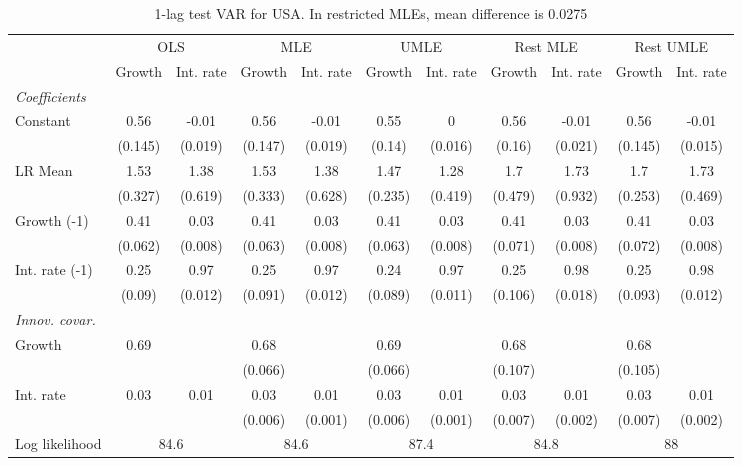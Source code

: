\begin{table}[htbp] 
	\centering
	\begin{tabular}{@{\extracolsep{4pt}}lcccccccccc@{}}		\hline\hline
		 		 & \multicolumn{2}{c}{OLS} &\multicolumn{2}{c}{MLE} &\multicolumn{2}{c}{UMLE} &\multicolumn{2}{c}{Rest MLE} &\multicolumn{2}{c}{Rest UMLE} \\ 
 		 & Growth 	 & Int. rate 	 & Growth 	 & Int. rate 	 & Growth 	 & Int. rate 	 & Growth 	 & Int. rate 	 & Growth 	 & Int. rate\\\cline{2-3}\cline{4-5}\cline{6-7}\cline{8-9}\cline{10-11}
\rule{0pt}{4ex} 
 \emph{Coefficients} 	  		 & 		 & 		 & 		 & 		 & 		 & 		 & 		 & 		 & 		 &\\ 
\quad Constant 	 & 0.56 	 & -0.01 	 & 0.56 	 & -0.01 	 & 0.55 	 & 0 	 & 0.56 	 & -0.01 	 & 0.56 	 & -0.01	 \\ 
 		 & (0.145) 	 & (0.019) 	 & (0.147) 	 & (0.019) 	 & (0.14) 	 & (0.016) 	 & (0.16) 	 & (0.021) 	 & (0.145) 	 & (0.015) 	 \\ 
\quad LR Mean 	 & 1.53 	 & 1.38 	 & 1.53 	 & 1.38 	 & 1.47 	 & 1.28 	 & 1.7 	 & 1.73 	 & 1.7 	 & 1.73	 \\ 
 		 & (0.327) 	 & (0.619) 	 & (0.333) 	 & (0.628) 	 & (0.235) 	 & (0.419) 	 & (0.479) 	 & (0.932) 	 & (0.253) 	 & (0.469) 	 \\ 
\quad Growth (-1) 	 &0.41 	 & 0.03 	 & 0.41 	 & 0.03 	 & 0.41 	 & 0.03 	 & 0.41 	 & 0.03 	 & 0.41 	 & 0.03	 \\ 
 		 & (0.062) 	 & (0.008) 	 & (0.063) 	 & (0.008) 	 & (0.063) 	 & (0.008) 	 & (0.071) 	 & (0.008) 	 & (0.072) 	 & (0.008) 	 \\ 
\quad Int. rate (-1) 	 &0.25 	 & 0.97 	 & 0.25 	 & 0.97 	 & 0.24 	 & 0.97 	 & 0.25 	 & 0.98 	 & 0.25 	 & 0.98	 \\ 
 		 & (0.09) 	 & (0.012) 	 & (0.091) 	 & (0.012) 	 & (0.089) 	 & (0.011) 	 & (0.106) 	 & (0.018) 	 & (0.093) 	 & (0.012) 	 \\ 
\rule{0pt}{4ex} \emph{Innov. covar.}  	 & 	 & 	 & 	 & 	 & 	 & 	 & 	 & 	 & 	 &\\ 
\quad Growth 	 &0.69 	 &  	 & 0.68 	 &  	 & 0.69 	 &  	 & 0.68 	 &  	 & 0.68 	 & 	 \\ 
 		 &  	 &  	 & (0.066) 	 &  	 & (0.066) 	 &  	 & (0.107) 	 &  	 & (0.105) 	 &  	 \\ 
\quad Int. rate 	 &0.03 	 & 0.01 	 & 0.03 	 & 0.01 	 & 0.03 	 & 0.01 	 & 0.03 	 & 0.01 	 & 0.03 	 & 0.01	 \\ 
 		 &  	 &  	 & (0.006) 	 & (0.001) 	 & (0.006) 	 & (0.001) 	 & (0.007) 	 & (0.002) 	 & (0.007) 	 & (0.002) 	 \\ 
 \hline \rule{0pt}{4ex} 
  Log likelihood 	 &\multicolumn{2}{c}{84.6} 	 & \multicolumn{2}{c}{84.6} 	 & \multicolumn{2}{c}{87.4} 	 & \multicolumn{2}{c}{84.8} 	 & \multicolumn{2}{c}{88}\\ 

 \hline 	\end{tabular}		\caption{1-lag test VAR for USA. In restricted MLEs, mean difference is 0.0275}
		\label{tab:USA1lag}

\end{table}